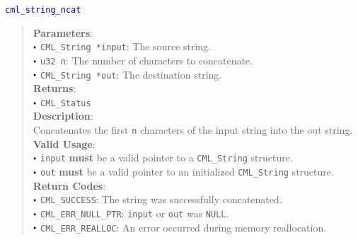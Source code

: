 \documentclass[a4paper,oneside,8pt]{extarticle}
\newcommand{\function}[1]{
  \noindent\textcolor{blue}{\texttt{#1}}
  \vspace{-0.3em}
}
\renewcommand{\dot}{\raisebox{0.3ex}{\scalebox{0.6}{$\bullet$}}}
\theoremstyle{definition}
\begin{document}
\function{cml\_string\_ncat}
\begin{quote}
  \textbf{Parameters}: \\
  $\dot$ \texttt{CML\_String *input}: The source string. \\
  $\dot$ \texttt{u32 n}: The number of characters to concatenate. \\
  $\dot$ \texttt{CML\_String *out}: The destination string. \\
  \textbf{Returns}: \\
  $\dot$ \texttt{CML\_Status} \\

  \vspace{-0.75em}
  \textbf{Description}: \\
  Concatenates the first \texttt{n} characters of the input string into the out string. \\

  \vspace{-0.75em}
  \textbf{Valid Usage}: \\
  $\dot$ \texttt{input} \textbf{must} be a valid pointer to a \texttt{CML\_String} structure. \\
  $\dot$ \texttt{out} \textbf{must} be a valid pointer to an initialized \texttt{CML\_String} structure. \\

  \vspace{-0.75em}
  \textbf{Return Codes}: \\
  $\dot$ \texttt{CML\_SUCCESS}: The string was successfully concatenated. \\
  $\dot$ \texttt{CML\_ERR\_NULL\_PTR}: \texttt{input} or \texttt{out} was \texttt{NULL}. \\
  $\dot$ \texttt{CML\_ERR\_REALLOC}: An error occurred during memory reallocation. \\
\end{quote}
\end{document}
